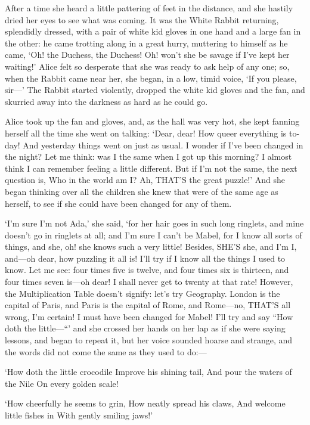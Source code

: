 \documentclass[12pt]{book}
\begin{document}
\begin{Parallel}[p]{}{}
{After a time she heard a little pattering of feet in the distance, and she hastily dried her eyes to see what was coming. It was the White Rabbit returning, splendidly dressed, with a pair of white kid gloves in one hand and a large fan in the other: he came trotting along in a great hurry, muttering to himself as he came, ‘Oh! the Duchess, the Duchess! Oh! won’t she be savage if I’ve kept her waiting!’ Alice felt so desperate that she was ready to ask help of any one; so, when the Rabbit came near her, she began, in a low, timid voice, ‘If you please, sir—’ The Rabbit started violently, dropped the white kid gloves and the fan, and skurried away into the darkness as hard as he could go.

Alice took up the fan and gloves, and, as the hall was very hot, she kept fanning herself all the time she went on talking: ‘Dear, dear! How queer everything is to-day! And yesterday things went on just as usual. I wonder if I’ve been changed in the night? Let me think: was I the same when I got up this morning? I almost think I can remember feeling a little different. But if I’m not the same, the next question is, Who in the world am I? Ah, THAT’S the great puzzle!’ And she began thinking over all the children she knew that were of the same age as herself, to see if she could have been changed for any of them.

‘I’m sure I’m not Ada,’ she said, ‘for her hair goes in such long ringlets, and mine doesn’t go in ringlets at all; and I’m sure I can’t be Mabel, for I know all sorts of things, and she, oh! she knows such a very little! Besides, SHE’S she, and I’m I, and—oh dear, how puzzling it all is! I’ll try if I know all the things I used to know. Let me see: four times five is twelve, and four times six is thirteen, and four times seven is—oh dear! I shall never get to twenty at that rate! However, the Multiplication Table doesn’t signify: let’s try Geography. London is the capital of Paris, and Paris is the capital of Rome, and Rome—no, THAT’S all wrong, I’m certain! I must have been changed for Mabel! I’ll try and say “How doth the little—“’ and she crossed her hands on her lap as if she were saying lessons, and began to repeat it, but her voice sounded hoarse and strange, and the words did not come the same as they used to do:—

     ‘How doth the little crocodile
      Improve his shining tail,
     And pour the waters of the Nile
      On every golden scale!

     ‘How cheerfully he seems to grin,
      How neatly spread his claws,
     And welcome little fishes in
      With gently smiling jaws!’

}
\end{Parallel}
\end{document}
